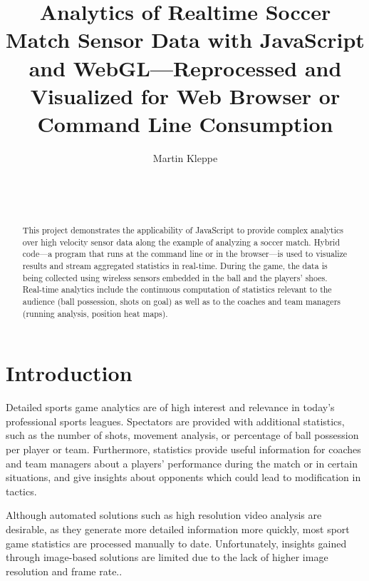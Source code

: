\documentclass{sig-alternate}
\begin{document}
\title{Analytics of Realtime Soccer Match Sensor Data with JavaScript and WebGL---Reprocessed and Visualized for Web Browser or Command Line Consumption}

\author{
\alignauthor
Martin Kleppe\\
  \\
  \\
  \\
}
\maketitle

\begin{abstract}
This project demonstrates the applicability of JavaScript
to provide complex analytics over high velocity sensor data
along the example of analyzing a soccer match.
Hybrid code---a program that runs at the command line
or in the browser---is used to visualize results
and stream aggregated statistics in real-time.
During the game, the data is being collected
using wireless sensors embedded in the ball
and the players' shoes.
Real-time analytics include the continuous computation
of statistics relevant to the audience
(ball possession, shots on goal)
as well as to the coaches and team managers
(running analysis, position heat maps).
\end{abstract}


\section{Introduction}

Detailed sports game analytics are of high interest and
relevance in today’s professional sports leagues.
Spectators are provided with additional statistics,
such as the number of shots, movement analysis,
or percentage of ball possession per player or team.
Furthermore, statistics provide useful information
for coaches and team managers about a players' performance
during the match or in certain situations,
and give insights about opponents
which could lead to modification in tactics.

Although automated solutions
such as high resolution video analysis are desirable,
as they generate more detailed information more quickly,
most sport game statistics are processed manually to date.
Unfortunately, insights gained through image-based solutions
are limited due to the lack of higher image resolution
and frame rate..
\end{document}
